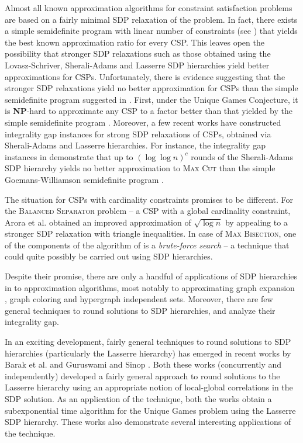 \documentclass[11pt]{article}
\theoremstyle{definition}
\newcommand{\etal}{et al.\xspace}
\newcommand{\problemmacro}[1]{\texorpdfstring{\textsc{#1}}{#1}\xspace}
\newcommand{\maxcut}{\problemmacro{Max Cut}}
\newcommand{\balancedseparator}{\problemmacro{Balanced Separator}}
\newcommand{\maxbisection}{\problemmacro{Max Bisection}}
\numberwithin{equation}{section}
\newcommand{\cclassmacro}[1]{\texorpdfstring{\textbf{#1}}{#1}\xspace}
\newcommand{\NP}{\cclassmacro{NP}}
\begin{document}
Almost all known approximation algorithms for constraint satisfaction
problems are based on a fairly minimal SDP relaxation of the problem.
In fact, there exists a simple semidefinite program with linear number
of constraints (see \cite{Raghavendra08, RaghavendraS09b}) that yields the
best known approximation ratio for every CSP. This leaves open the possibility that stronger SDP relaxations such as
those obtained using the Lovasz-Schriver, Sherali-Adams and Lasserre
SDP hierarchies yield better approximations for CSPs.  Unfortunately,
there is evidence suggesting that the stronger SDP relaxations yield
no better approximation for CSPs than the simple semidefinite program
suggested in \cite{Raghavendra08,RaghavendraS09b}.  First, under the
Unique Games Conjecture, it is \NP-hard to approximate any CSP to a
factor better than that yielded by the simple semidefinite program
\cite{Raghavendra08}.  Moreover, a few recent works \cite{KhotS09,
Tulsiani09, RaghavendraS09c} have constructed
integrality gap instances for strong SDP relaxations of CSPs, obtained via Sherali-Adams and Lasserre
hierarchies.  For instance, the integrality gap instances in
\cite{KhotS09,RaghavendraS09c} demonstrate that up to $(\log\log n)^c$
rounds of the Sherali-Adams SDP hierarchy yields no better approximation
to \maxcut than the simple Goemans-Williamson semidefinite program
\cite{GoemansW95}.

The situation for CSPs with cardinality constraints promises
to be different.  For the \balancedseparator problem -- a CSP with a
global cardinality constraint, Arora \etal \cite{AroraRV04} obtained
an improved approximation of $\sqrt{\log n}$ by appealing to a
stronger SDP relaxation with triangle inequalities.  In case of
\maxbisection, one of the components of the algorithm of
\cite{GuruswamiMRSZ11} is a {\it brute-force search} -- a technique
that could quite possibly be carried out using SDP hierarchies.

Despite their promise, there are only a handful of applications of SDP hierarchies
in to approximation algorithms, most notably to approximating graph
expansion \cite{AroraRV04}, graph coloring and hypergraph independent
sets.  Moreover, there are few general techniques to round solutions to
SDP hierarchies, and analyze their integrality gap.

In an exciting development, fairly general techniques to round
solutions to SDP hierarchies (particularly the Lasserre hierarchy) has
emerged in recent works by Barak \etal \cite{BarakRS11} and Guruswami
and Sinop \cite{GuruswamiS11}.
Both these works (concurrently and independently) developed a fairly
general approach to round solutions to the Lasserre hierarchy using
an appropriate notion of local-global correlations in the SDP solution.
As an application of the technique, both the works obtain a
subexponential time algorithm for the Unique
Games problem using the Lasserre SDP hierarchy.  These works also
demonstrate several interesting applications of the technique.
\end{document}
